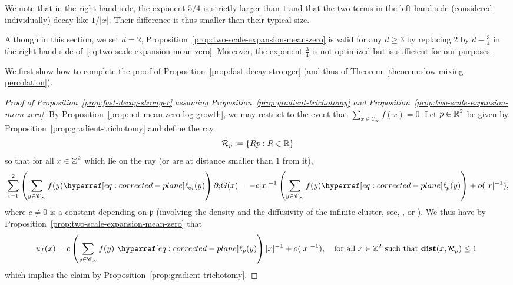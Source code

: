 \documentclass[12pt]{amsart}
\numberwithin{equation}{section}
\begin{document}
	\begin{remark}
		We note that in the right hand side, the exponent $5/4$ is strictly larger than $1$ and that the two terms in the left-hand side (considered individually) decay like $1/|x|$. Their difference is thus smaller than their typical size. 
	\end{remark}
	
	\begin{remark}
		Although in this section, we set $d = 2$, 
		Proposition~\ref{prop:two-scale-expansion-mean-zero} is valid for any $d \geq 3$ by replacing $2$ by $d - \frac{3}{4}$ in the right-hand side of~\eqref{eq:two-scale-expansion-mean-zero}. 
		Moreover, the exponent $\frac{3}{4}$ is not optimized but is sufficient for our purposes. 
	\end{remark}
	
	
	
	
	We first show how to complete the proof of Proposition~\ref{prop:fast-decay-stronger} (and thus of Theorem~\ref{theorem:slow-mixing-percolation}).
	
	\begin{proof}[Proof of Proposition~\ref{prop:fast-decay-stronger} assuming Proposition~\ref{prop:gradient-trichotomy} and Proposition~\ref{prop:two-scale-expansion-mean-zero}]
		By Proposition~\ref{prop:not-mean-zero-log-growth}, we may restrict to the event that $\sum_{x \in \mathscr{C}_\infty} f(x) = 0$.
		Let $p \in \operatorname{\mathbb{R}}^2$ be given by Proposition~\ref{prop:gradient-trichotomy} and define the ray 
		\[
		\mathcal{R}_p := \{ R p : R \in \operatorname{\mathbb{R}} \}
		\]
		so that for all $x \in \operatorname{\mathbb{Z}}^2$ which lie on the ray (or are at distance smaller than $1$ from it), 
		\[
		\sum_{i = 1}^2 \left(  \sum_{y \in \mathscr{C}_\infty} f(y) \ellp{e_i}(y) \right)  \partial_i \bar G(x) = - c |x|^{-1} \left( \sum_{y \in \mathscr{C}_\infty} f(y) \ellp{p}(y) \right)  + o(|x|^{-1}),
		\]
		where $c \neq 0$ is a constant depending on $\mathfrak{p}$ (involving the density and the diffusivity of the infinite cluster, see, \eg, \cite[equation (1.9)]{BH09} or \cite[equation (1.9)]{dario-gu-green}). We thus have by Proposition~\ref{prop:two-scale-expansion-mean-zero}
		that
		\begin{equation*}
			u_f (x) =  c \left(\sum_{y \in \mathscr{C}_\infty} f(y) \ \ellp{p}(y)  \right)  |x|^{-1}  + o(|x|^{-1}), \quad \mbox{for all $x \in \Z^2$ such that $\dist( x, \mathcal{R}_p) \leq 1$ }
		\end{equation*}
		which implies the claim by Proposition~\ref{prop:gradient-trichotomy}.  
	\end{proof}
	
\end{document}
